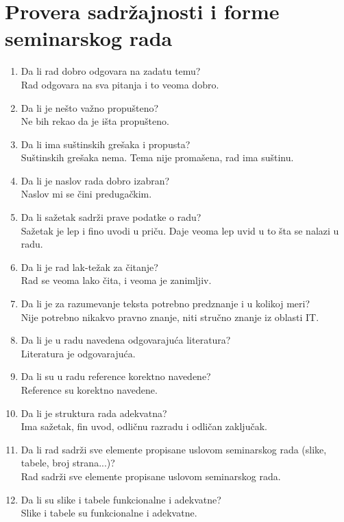 \documentclass[a4paper]{report}
\begin{document}
\section{Provera sadržajnosti i forme seminarskog rada}

\begin{enumerate}
\item Da li rad dobro odgovara na zadatu temu?\\ Rad odgovara na sva pitanja i to veoma dobro.
\item Da li je nešto važno propušteno?\\ Ne bih rekao da je išta propušteno.
\item Da li ima suštinskih grešaka i propusta?\\ Suštinskih grešaka nema. Tema nije promašena, rad ima suštinu.
\item Da li je naslov rada dobro izabran?\\ Naslov mi se čini predugačkim.
\item Da li sažetak sadrži prave podatke o radu?\\ Sažetak je lep i fino uvodi u priču. Daje veoma lep uvid u to šta se nalazi u radu.
\item Da li je rad lak-težak za čitanje?\\ Rad se veoma lako čita, i veoma je zanimljiv.
\item Da li je za razumevanje teksta potrebno predznanje i u kolikoj meri?\\ Nije potrebno nikakvo pravno znanje, niti stručno znanje iz oblasti IT.
\item Da li je u radu navedena odgovarajuća literatura?\\ Literatura je odgovarajuća.
\item Da li su u radu reference korektno navedene?\\ Reference su korektno navedene.
\item Da li je struktura rada adekvatna?\\ Ima sažetak, fin uvod, odličnu razradu i odličan zaključak.
\item Da li rad sadrži sve elemente propisane uslovom seminarskog rada (slike, tabele, broj strana...)?\\ Rad sadrži sve elemente propisane uslovom seminarskog rada.
\item Da li su slike i tabele funkcionalne i adekvatne?\\ Slike i tabele su funkcionalne i adekvatne.
\end{enumerate}
\end{document}
